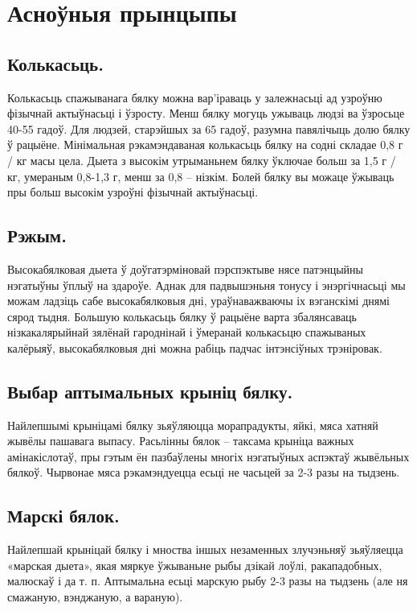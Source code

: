 \section{Асноўныя прынцыпы}

\subsection{Колькасьць.}
Колькасьць спажыванага бялку можна вар'іраваць у залежнасьці ад узроўню фізычнай актыўнасьці і ўзросту. Менш бялку могуць ужываць людзі ва ўзросьце 40-55 гадоў. Для людзей, старэйшых за 65 гадоў, разумна павялічыць долю бялку ў рацыёне. Мінімальная рэкамэндаваная колькасьць бялку на содні складае 0,8 г / кг масы цела. Дыета з высокім утрыманьнем бялку ўключае больш за 1,5 г / кг, умераным 0,8-1,3 г, менш за 0,8 – нізкім. Болей бялку вы можаце ўжываць пры больш высокім узроўні фізычнай актыўнасьці.

\subsection{Рэжым.}
Высокабялковая дыета ў доўгатэрміновай пэрспэктыве нясе патэнцыйны нэгатыўны ўплыў на здароўе. Аднак для падвышэньня тонусу і энэргічнасьці мы можам ладзіць сабе высокабялковыя дні, ураўнаважваючы іх вэганскімі днямі сярод тыдня. Большую колькасьць бялку ў рацыёне варта збалянсаваць нізкакалярыйнай зялёнай гароднінай і ўмеранай колькасьцю спажываных калёрыяў, высокабялковыя дні можна рабіць падчас інтэнсіўных трэніровак.

\subsection{Выбар аптымальных крыніц бялку.}
Найлепшымі крыніцамі бялку зьяўляюцца морапрадукты, яйкі, мяса хатняй жывёлы пашавага выпасу. Расьлінны бялок – таксама крыніца важных амінакіслотаў, пры гэтым ён пазбаўлены многіх нэгатыўных аспэктаў жывёльных бялкоў. Чырвонае мяса рэкамэндуецца есьці не часьцей за 2-3 разы на тыдзень.

\subsection{Марскі бялок.}
Найлепшай крыніцай бялку і мноства іншых незаменных злучэньняў зьяўляецца «марская дыета», якая мяркуе ўжываньне рыбы дзікай лоўлі, ракападобных, малюскаў і да т. п. Аптымальна есьці марскую рыбу 2-3 разы на тыдзень (але ня смажаную, вэнджаную, а вараную).

